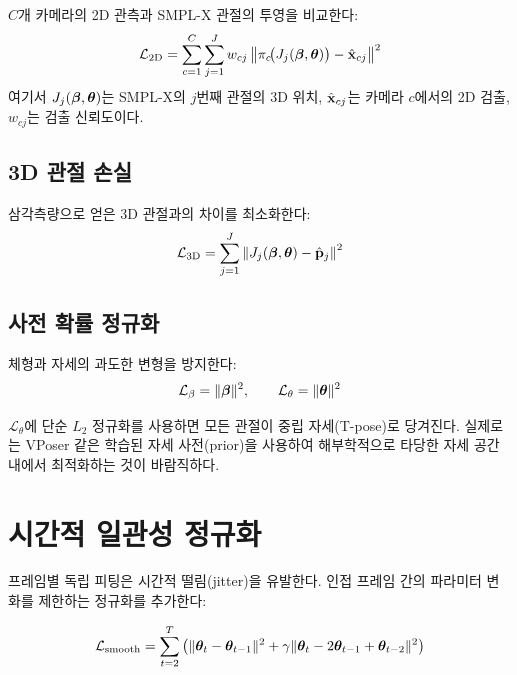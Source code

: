\documentclass[11pt, a4paper]{report}
\begin{document}
$C$개 카메라의 2D 관측과 SMPL-X 관절의 투영을 비교한다:
\begin{equation}
  \mathcal{L}_{\text{2D}} = \sum_{c=1}^{C} \sum_{j=1}^{J} w_{cj} \left\| \pi_c\!\big(J_j(\bm{\beta}, \bm{\theta})\big) - \hat{\mathbf{x}}_{cj} \right\|^2
\end{equation}
여기서 $J_j(\bm{\beta}, \bm{\theta})$는 SMPL-X의 $j$번째 관절의 3D 위치,
$\hat{\mathbf{x}}_{cj}$는 카메라 $c$에서의 2D 검출, $w_{cj}$는 검출 신뢰도이다.

\subsection{3D 관절 손실}

삼각측량으로 얻은 3D 관절과의 차이를 최소화한다:
\begin{equation}
  \mathcal{L}_{\text{3D}} = \sum_{j=1}^{J} \left\| J_j(\bm{\beta}, \bm{\theta}) - \hat{\mathbf{p}}_j \right\|^2
\end{equation}

\subsection{사전 확률 정규화}

체형과 자세의 과도한 변형을 방지한다:
\begin{equation}
  \mathcal{L}_{\beta} = \|\bm{\beta}\|^2, \qquad
  \mathcal{L}_{\theta} = \|\bm{\theta}\|^2
\end{equation}

\begin{importantnote}
$\mathcal{L}_{\theta}$에 단순 $L_2$ 정규화를 사용하면 모든 관절이 중립 자세(T-pose)로
당겨진다. 실제로는 VPoser \cite{pavlakos2019} 같은 학습된 자세 사전(prior)을 사용하여
해부학적으로 타당한 자세 공간 내에서 최적화하는 것이 바람직하다.
\end{importantnote}

\section{시간적 일관성 정규화}

프레임별 독립 피팅은 시간적 떨림(jitter)을 유발한다.
인접 프레임 간의 파라미터 변화를 제한하는 정규화를 추가한다:

\begin{equation}
  \mathcal{L}_{\text{smooth}} = \sum_{t=2}^{T} \left( \|\bm{\theta}_t - \bm{\theta}_{t-1}\|^2 + \gamma \|\bm{\theta}_t - 2\bm{\theta}_{t-1} + \bm{\theta}_{t-2}\|^2 \right)
\end{equation}
\end{document}
